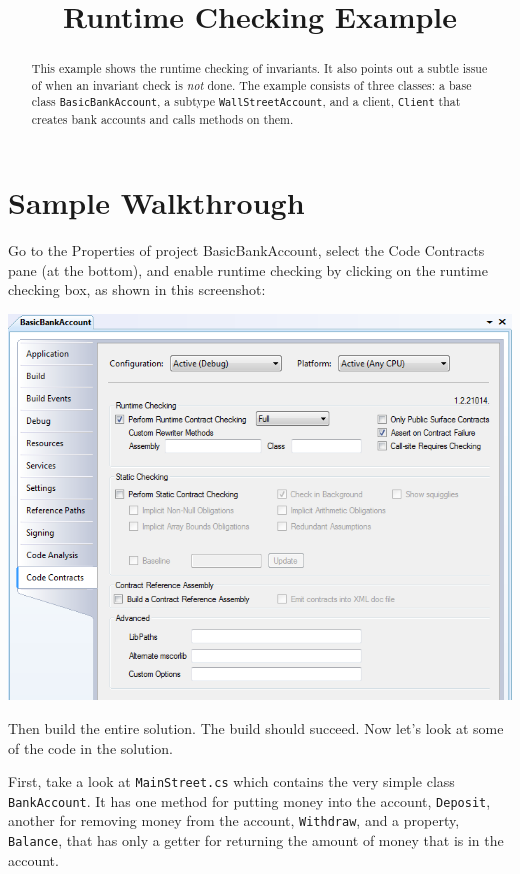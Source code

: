 \documentclass{article}
\title{\ProjectName{} Runtime Checking Example}
\date{}
\newcommand{\code}[1]{\lstinline{#1}}
\begin{document}
\maketitle

\begin{abstract}
This example shows the runtime checking of invariants.
It also points out a subtle issue of when an invariant check
is {\em not} done.
The example consists of three classes: a base class
\code{BasicBankAccount}, a subtype \code{WallStreetAccount}, and
a client, \code {Client} that creates bank accounts and calls methods on them.
\end{abstract}



\section{Sample Walkthrough}
\label{sec:start}

Go to the Properties of project
\textsf{BasicBankAccount}, select the Code Contracts pane (at the bottom), and enable runtime
checking by clicking on the runtime checking box, as shown in this screenshot:
\begin{center}
  \includegraphics[width=.8\columnwidth]{ex1.png}
\end{center}

Then build the entire solution. The build should succeed.
Now let's look at some of the code in the solution.

First, take a look at \code{MainStreet.cs} which contains the very simple
class \code{BankAccount}.
It has one method for putting money into the account, \code{Deposit}, another
for removing money from the account, \code{Withdraw}, and a property, \code{Balance}, that has
only a getter for returning the amount of money that is in the account.
\end{document}
